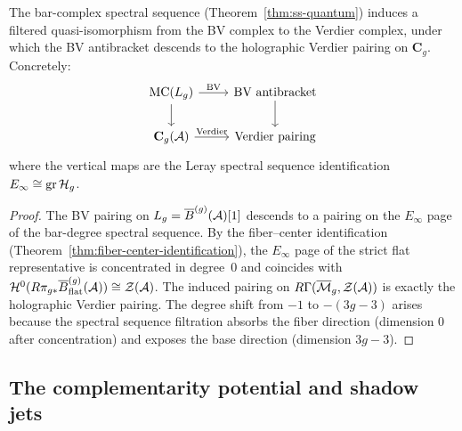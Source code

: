 \begin{proposition}
\label{prop:thqg-III-compatibility}
The bar-complex spectral sequence
\textup{(}Theorem~\textup{\ref{thm:ss-quantum})} induces a
filtered quasi-isomorphism from the BV complex to the Verdier
complex, under which the BV antibracket descends to the
holographic Verdier pairing on $\mathbf{C}_g$. Concretely:
\begin{equation}\label{eq:thqg-III-compatibility-diagram}
\begin{tikzcd}
\MC(L_g) \arrow[r, "{\text{BV}}"] \arrow[d] &
\text{BV antibracket} \arrow[d] \\
\mathbf{C}_g(\cA)
\arrow[r, "{\text{Verdier}}"]
& \text{Verdier pairing}
\end{tikzcd}
\end{equation}
where the vertical maps are the Leray spectral sequence
identification $E_\infty \cong \operatorname{gr} \mathcal{H}_g$.
\end{proposition}

\begin{proof}
The BV pairing on $L_g = \overline{B}^{(g)}(\mathcal{A})[1]$ descends to
a pairing on the $E_\infty$ page of the bar-degree spectral
sequence. By the fiber--center identification
(Theorem~\ref{thm:fiber-center-identification}), the
$E_\infty$ page of the strict flat representative is
concentrated in degree~$0$ and coincides with
$\mathcal{H}^0(R\pi_{g*}\overline{B}^{(g)}_{\mathrm{flat}}(\mathcal{A}))
\cong \mathcal{Z}(\mathcal{A})$.
The induced pairing on $R\Gamma(\overline{\mathcal{M}}_g,
\mathcal{Z}(\mathcal{A}))$ is exactly the holographic Verdier pairing.
The degree shift from $-1$ to $-(3g-3)$ arises because the
spectral sequence filtration absorbs the fiber direction
(dimension $0$ after concentration) and exposes the base
direction (dimension $3g - 3$).
\end{proof}

%
%

\subsection{The complementarity potential and shadow jets}
\label{subsec:thqg-III-complementarity-potential}

